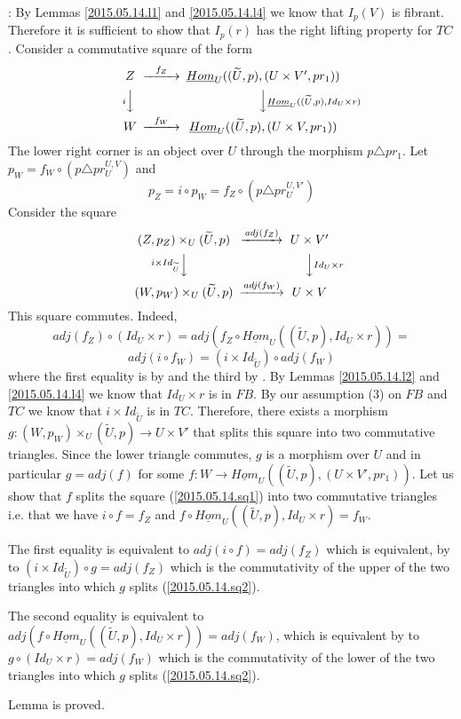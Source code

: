 \documentclass[12pt]{article}
\newenvironment{eq}{\begin{equation}}{\end{equation}}
\newenvironment{myproof}{{\bf Proof}:}{\vskip 5mm }
\newcommand{\llabel}[1]{\label{#1}}
\newcommand{\sr}{\rightarrow}
\newcommand{\uu}{\underline}
\newcommand{\wt}{\widetilde}
\begin{document}
\begin{myproof}
By Lemmas \ref{2015.05.14.l1} and \ref{2015.05.14.l4} we know that $I_p(V)$ is fibrant. Therefore it is sufficient to show that $I_p(r)$ has the right lifting property for $TC$. Consider a commutative square of the form 
%
\begin{eq}
\llabel{2015.05.14.sq1}
\begin{CD}
Z @>f_Z>> \uu{Hom}_U((\wt{U},p),(U\times V',pr_1))\\
@V i VV @VV \uu{Hom}_U((\wt{U},p), Id_U\times r) V\\
W @>f_W >> \uu{Hom}_U((\wt{U},p), (U\times V, pr_1))
\end{CD}
\end{eq}
%
The lower right corner is an object over $U$ through the morphism $p\triangle pr_1$. Let $p_W=f_W\circ (p\triangle pr^{U,V}_U)$ and 
%
$$p_Z=i\circ p_W=f_Z\circ (p\triangle pr^{U,V'}_U)$$
%
Consider the square
%
\begin{eq}
\llabel{2015.05.14.sq2}
\begin{CD}
(Z,p_Z)\times_U (\wt{U},p) @>adj(f_Z)>> U\times V'\\
@Vi\times Id_{\wt{U}} VV @VV Id_U\times r V\\
(W,p_W)\times_U (\wt{U},p) @>adj(f_W)>> U\times V
\end{CD}
\end{eq}
%
This square commutes. Indeed,
%
$$adj(f_Z)\circ (Id_U\times r )=adj(f_Z\circ \uu{Hom}_U((\wt{U},p), Id_U\times r))=$$
$$adj(i\circ f_W)=(i\times Id_{\wt{U}})\circ adj (f_W)$$
%
where the first equality is by \cite[Lemma 8.7(1)]{fromunivwithPi} and the third by \cite[Lemma 8.7(3)]{fromunivwithPi}. By Lemmas \ref{2015.05.14.l2} and \ref{2015.05.14.l4} we know that $Id_U\times r$ is in $FB$. By our assumption (3) on $FB$ and $TC$ we know that $i\times Id_{\wt{U}}$ is in $TC$. Therefore, there exists a morphism $g:(W,p_W)\times_U (\wt{U},p) \sr U\times V'$ that splits this square into two commutative triangles. Since the lower triangle commutes, $g$ is a morphism over $U$ and in particular $g=adj(f)$ for some $f:W\sr \uu{Hom}_U((\wt{U},p),(U\times V',pr_1))$. Let us show that $f$ splits the square (\ref{2015.05.14.sq1}) into two commutative triangles i.e. that we have $i\circ f= f_Z$ and $f\circ \uu{Hom}_U((\wt{U},p), Id_U\times r)=f_W$. 

The first equality is equivalent to $adj(i\circ f)=adj(f_Z)$ which is equivalent, by \cite[Lemma 8.7(3)]{fromunivwithPi} to $(i\times Id_{\wt{U}})\circ g=adj(f_Z)$ which is the commutativity of the upper of the two triangles into which $g$ splits (\ref{2015.05.14.sq2}). 

The second equality is equivalent to $adj(f\circ \uu{Hom}_U((\wt{U},p), Id_U\times r))=adj(f_W)$, which is equivalent by \cite[Lemma 8.7(1)]{fromunivwithPi} to 
$g\circ (Id_U\times r)=adj(f_W)$ which is the commutativity of the lower of the two triangles into which $g$ splits (\ref{2015.05.14.sq2}). 

Lemma is proved.
\end{myproof}
\end{document}

